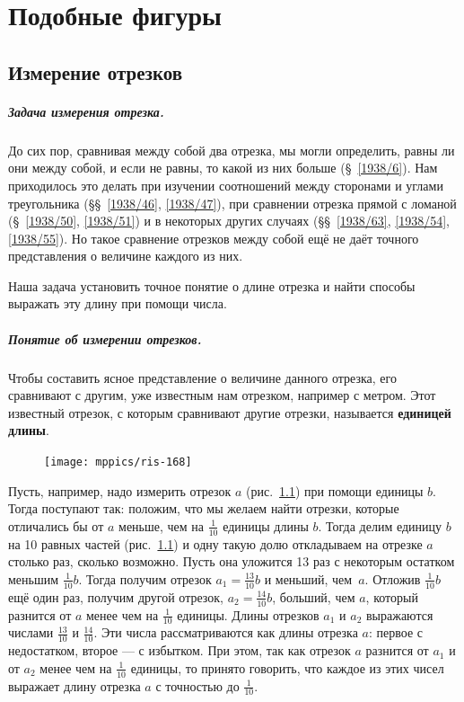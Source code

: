 \documentclass[twoside]{book}
\makeatletter
\newcommand{\rindex}[2][\imki@jobname]{%
  \index[#1]{\detokenize{#2}}%
}
\makeatother
\begin{document}
\chapter{Подобные фигуры}

\section{Измерение отрезков}

\paragraph{Задача измерения отрезка.}\label{1938/144}
До сих пор, сравнивая между собой два отрезка, мы могли определить, равны ли они между собой, и если не равны, то какой из них больше (§~\ref{1938/6}).
Нам приходилось это делать при изучении соотношений между сторонами и углами треугольника (§§~\ref{1938/46}, \ref{1938/47}), при сравнении отрезка прямой с ломаной (§~\ref{1938/50}, \ref{1938/51}) и в некоторых других случаях (§§~\ref{1938/63}, \ref{1938/54}, \ref{1938/55}).
Но такое сравнение отрезков между собой ещё не даёт точного представления о величине каждого из них.

Наша задача установить точное понятие о длине отрезка и найти способы выражать эту длину при помощи числа.

\paragraph{Понятие об измерении отрезков.}\label{1938/150} 
Чтобы составить ясное представление о величине данного отрезка, его сравнивают с другим, уже известным нам отрезком, например с метром.
Этот известный отрезок, с которым сравнивают другие отрезки, называется \rindex{единица длины}\textbf{единицей длины}.

\begin{figure}[h!]
\centering
\texttt{[image: mppics/ris-168]}
\caption{}\label{1938/ris-168}
\end{figure}

Пусть, например, надо измерить отрезок $a$ (рис.~\ref{1938/ris-168}) при помощи единицы $b$.
Тогда поступают так:
положим, что мы желаем найти отрезки, которые отличались бы от $a$ меньше, чем на
$\tfrac1{10}$ единицы длины $b$.
Тогда делим единицу $b$ на 10 равных частей (рис.~\ref{1938/ris-168}) и одну такую долю откладываем на отрезке $a$ столько раз, сколько возможно.
Пусть она уложится 13 раз с некоторым остатком меньшим $\tfrac1{10}b$.
Тогда получим отрезок $a_1=\tfrac{13}{10}b$ и меньший, чем~$a$.
Отложив $\tfrac1{10}b$ ещё один раз, получим другой отрезок, $a_2=\tfrac{14}{10}b$,  больший, чем $a$, который разнится от $a$ менее чем на $\tfrac1{10}$ единицы.
Длины отрезков $a_1$ и $a_2$ выражаются числами $\tfrac{13}{10}$ и $\tfrac{14}{10}$.
Эти числа рассматриваются как  длины отрезка $a$:
первое с недостатком, второе — с избытком.
При этом, так как отрезок $a$ разнится от $a_1$ и от $a_2$ менее чем на $\tfrac1{10}$ единицы, то принято говорить, что каждое из этих чисел выражает длину отрезка $a$ с точностью до $\tfrac1{10}$.
\end{document}
